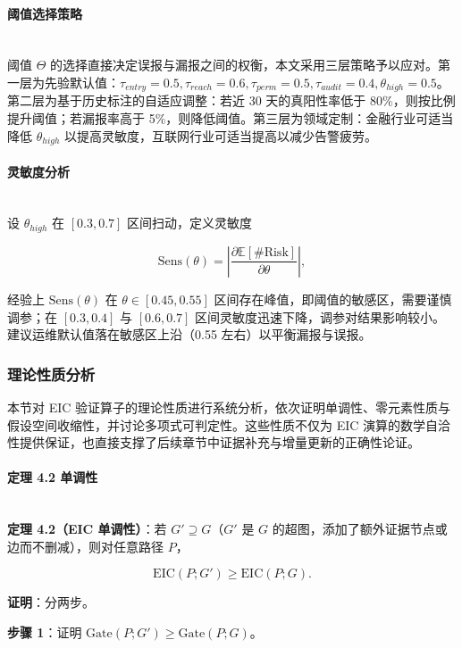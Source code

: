\documentclass[a4paper,12pt]{ctexart}
\begin{document}
\paragraph{阈值选择策略}\mbox{}\\

阈值 $\Theta$ 的选择直接决定误报与漏报之间的权衡，本文采用三层策略予以应对。第一层为先验默认值：$\tau_{entry} = 0.5, \tau_{reach} = 0.6, \tau_{perm} = 0.5, \tau_{audit} = 0.4, \theta_{high} = 0.5$。第二层为基于历史标注的自适应调整：若近 30 天的真阳性率低于 80\%，则按比例提升阈值；若漏报率高于 5\%，则降低阈值。第三层为领域定制：金融行业可适当降低 $\theta_{high}$ 以提高灵敏度，互联网行业可适当提高以减少告警疲劳。

\paragraph{灵敏度分析}\mbox{}\\

设 $\theta_{high}$ 在 $[0.3, 0.7]$ 区间扫动，定义灵敏度

\[
\text{Sens}(\theta) = \left| \frac{\partial \mathbb{E}[\#\text{Risk}]}{\partial \theta} \right|,
\]

经验上 $\text{Sens}(\theta)$ 在 $\theta \in [0.45, 0.55]$ 区间存在峰值，即阈值的敏感区，需要谨慎调参；在 $[0.3, 0.4]$ 与 $[0.6, 0.7]$ 区间灵敏度迅速下降，调参对结果影响较小。建议运维默认值落在敏感区上沿（0.55 左右）以平衡漏报与误报。

\subsubsection{理论性质分析}

本节对 EIC 验证算子的理论性质进行系统分析，依次证明单调性、零元素性质与假设空间收缩性，并讨论多项式可判定性。这些性质不仅为 EIC 演算的数学自洽性提供保证，也直接支撑了后续章节中证据补充与增量更新的正确性论证。

\paragraph{定理 4.2 单调性}\mbox{}\\

\textbf{定理 4.2（EIC 单调性）}：若 $G' \supseteq G$（$G'$ 是 $G$ 的超图，添加了额外证据节点或边而不删减），则对任意路径 $P$，

\[
\text{EIC}(P; G') \geq \text{EIC}(P; G).
\]

\textbf{证明}：分两步。

\textbf{步骤 1}：证明 $\text{Gate}(P; G') \geq \text{Gate}(P; G)$。
\end{document}
